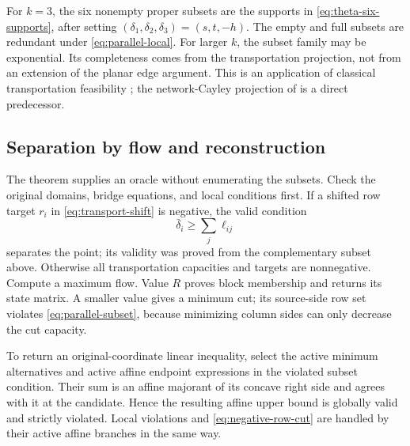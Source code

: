 For $k=3$, the six nonempty proper subsets are the supports in
\eqref{eq:theta-six-supports}, after setting
$(\delta_1,\delta_2,\delta_3)=(s,t,-h)$. The empty and full subsets
are redundant under \eqref{eq:parallel-local}. For larger $k$, the
subset family may be exponential. Its completeness comes from the
transportation projection, not from an extension of the planar edge
argument. This is an application of classical transportation feasibility
\citep{FordFulkerson1956Transportation}; the network-Cayley projection
of \citet[Section~5.7]{KisHorvath2022} is a direct predecessor.

\subsection{Separation by flow and reconstruction}\label{subsec:parallel-oracle}
The theorem supplies an oracle without enumerating the subsets. Check
the original domains, bridge equations, and local conditions first.
If a shifted row target $r_i$ in \eqref{eq:transport-shift} is negative,
the valid condition
\begin{equation}\label{eq:negative-row-cut}
 \bar\delta_i\ge\sum_j\ell_{ij}
\end{equation}
separates the point; its validity was proved from the complementary
subset above. Otherwise all transportation capacities and targets are
nonnegative. Compute a maximum flow. Value $R$ proves block membership
and returns its state matrix. A smaller value gives a minimum cut;
its source-side row set violates \eqref{eq:parallel-subset}, because
minimizing column sides can only decrease the cut capacity.

To return an original-coordinate linear inequality, select the active
minimum alternatives and active affine endpoint expressions in the
violated subset condition. Their sum is an affine majorant of its
concave right side and agrees with it at the candidate. Hence the
resulting affine upper bound is globally valid and strictly violated.
Local violations and \eqref{eq:negative-row-cut} are handled by their
active affine branches in the same way.

